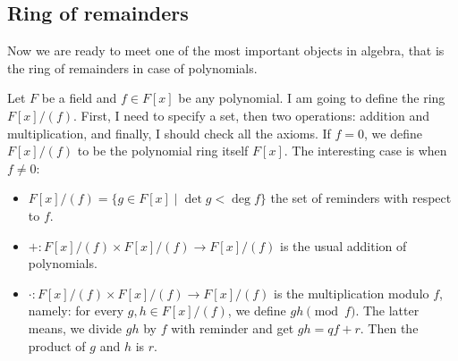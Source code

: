\subsection{Ring of remainders}

Now we are ready to meet one of the most important objects in algebra, that is the ring of remainders in case of polynomials.

Let $F$ be a field and $f\in F[x]$ be any polynomial.
I am going to define the ring $F[x]/(f)$.
First, I need to specify a set, then two operations: addition and multiplication, and finally, I should check all the axioms.
If $f = 0$, we define $F[x]/(f)$ to be the polynomial ring itself $F[x]$.
The interesting case is when $f \neq 0$:
\begin{itemize}
\item $F[x]/(f) = \{g \in F[x]\mid \det g < \deg f\}$ the set of reminders with respect to $f$.

\item $+\colon F[x]/(f)\times F[x]/(f) \to F[x]/(f)$ is the usual addition of polynomials.

\item $\cdot \colon F[x]/(f)\times F[x]/(f) \to F[x]/(f)$ is the multiplication modulo $f$, namely: for every $g, h\in F[x]/(f)$, we define $gh \pmod{f}$.
The latter means, we divide $gh$ by $f$ with reminder and get $gh = q f + r$.
Then the product of $g$ and $h$ is $r$.
\end{itemize}

